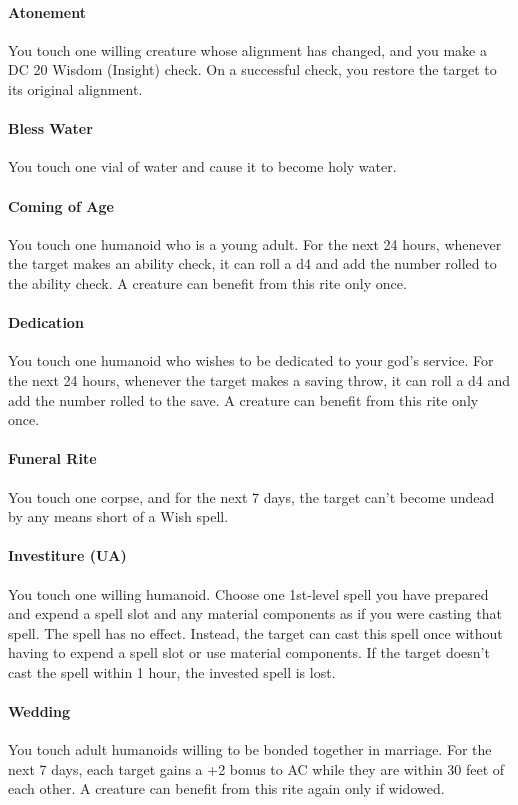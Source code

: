 \documentclass[12pt]{memoir}
\begin{document}
\paragraph{Atonement} You touch one willing creature whose alignment has changed, and you make a DC 20 Wisdom (Insight) check. On a successful check, you restore the target to its original alignment.

\paragraph{Bless Water} You touch one vial of water and cause it to become holy water.

\paragraph{Coming of Age} You touch one humanoid who is a young adult. For the next 24 hours, whenever the target makes an ability check, it can roll a d4 and add the number rolled to the ability check. A creature can benefit from this rite only once.

\paragraph{Dedication} You touch one humanoid who wishes to be dedicated to your god’s service. For the next 24 hours, whenever the target makes a saving throw, it can roll a d4 and add the number rolled to the save. A creature can benefit from this rite only once.

\paragraph{Funeral Rite} You touch one corpse, and for the next 7 days, the target can’t become undead by any means short of a Wish spell.

\paragraph{Investiture (UA)} You touch one willing humanoid. Choose one 1st-level spell you have prepared and expend a spell slot and any material components as if you were casting that spell. The spell has no effect. Instead, the target can cast this spell once without having to expend a spell slot or use material components. If the target doesn’t cast the spell within 1 hour, the invested spell is lost.

\paragraph{Wedding} You touch adult humanoids willing to be bonded together in marriage. For the next 7 days, each target gains a +2 bonus to AC while they are within 30 feet of each other. A creature can benefit from this rite again only if widowed.
\newpage
\end{document}
